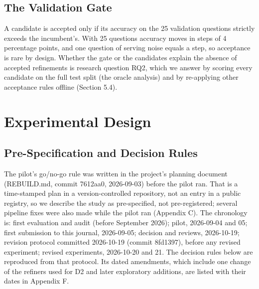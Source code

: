 \documentclass{ieeeaccess}
\begin{document}
\subsection{The Validation Gate}

A candidate is accepted only if its accuracy on the 25 validation questions strictly exceeds the incumbent's. With 25 questions accuracy moves in steps of 4 percentage points, and one question of serving noise equals a step, so acceptance is rare by design. Whether the gate or the candidates explain the absence of accepted refinements is research question RQ2, which we answer by scoring every candidate on the full test split (the oracle analysis) and by re-applying other acceptance rules offline (Section 5.4).

\section{Experimental Design}

\subsection{Pre-Specification and Decision Rules}

The pilot's go/no-go rule was written in the project's planning document (REBUILD.md, commit 7612aa0, 2026-09-03) before the pilot ran. That is a time-stamped plan in a version-controlled repository, not an entry in a public registry, so we describe the study as pre-specified, not pre-registered; several pipeline fixes were also made while the pilot ran (Appendix C). The chronology is: first evaluation and audit (before September 2026); pilot, 2026-09-04 and 05; first submission to this journal, 2026-09-05; decision and reviews, 2026-10-19; revision protocol committed 2026-10-19 (commit 8fd1397), before any revised experiment; revised experiments, 2026-10-20 and 21. The decision rules below are reproduced from that protocol. Its dated amendments, which include one change of the refiners used for D2 and later exploratory additions, are listed with their dates in Appendix F.
\end{document}
